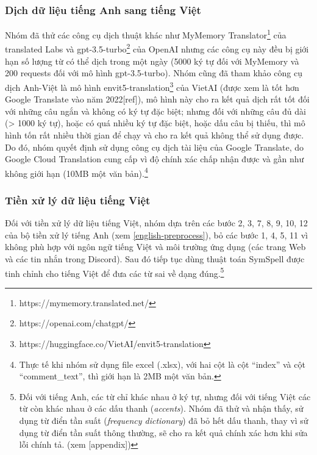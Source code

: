 \subsubsection{Dịch dữ liệu tiếng Anh sang tiếng Việt}
Nhóm đã thử các công cụ dịch thuật khác như MyMemory Translator\footnote{https://mymemory.translated.net/} của translated Labs và gpt-3.5-turbo\footnote{https://openai.com/chatgpt/} của OpenAI nhưng các công cụ này đều bị giới hạn số lượng từ có thể dịch trong một ngày (5000 ký tự đối với MyMemory và 200 requests đối với mô hình gpt-3.5-turbo). Nhóm cũng đã tham khảo công cụ dịch Anh-Việt là mô hình envit5-translation\footnote{https://huggingface.co/VietAI/envit5-translation} của VietAI (được xem là tốt hơn Google Translate vào năm 2022[ref]), mô hình này cho ra kết quả dịch rất tốt đối với những câu ngắn và không có ký tự đặc biệt; nhưng đối với những câu đủ dài (> 1000 ký tự), hoặc có quá nhiều ký tự đặc biệt, hoặc dấu câu bị thiếu, thì mô hình tốn rất nhiều thời gian để chạy và cho ra kết quả không thể sử dụng được. Do đó, nhóm quyết định sử dụng công cụ dịch tài liệu của Google Translate, do Google Cloud Translation cung cấp vì độ chính xác chấp nhận được và gần như không giới hạn (10MB một văn bản).\footnote{Thực tế khi nhóm sử dụng file excel (.xlsx), với hai cột là cột ``index'' và cột ``comment\_text'', thì giới hạn là 2MB một văn bản.}

\subsubsection{Tiền xử lý dữ liệu tiếng Việt}
Đối với tiền xử lý dữ liệu tiếng Việt, nhóm dựa trên các bước 2, 3, 7, 8, 9, 10, 12 của bộ tiền xử lý tiếng Anh (xem \ref{english-preprocess}), bỏ các bước 1, 4, 5, 11 vì không phù hợp với ngôn ngữ tiếng Việt và môi trường ứng dụng (các trang Web và các tin nhắn trong Discord). Sau đó tiếp tục dùng thuật toán SymSpell được tinh chỉnh cho tiếng Việt để đưa các từ sai về dạng đúng.\footnote{Đối với tiếng Anh, các từ chỉ khác nhau ở ký tự, nhưng đối với tiếng Việt các từ còn khác nhau ở các dấu thanh (\textit{accents}). Nhóm đã thử và nhận thấy, sử dụng từ điển tần suất (\textit{frequency dictionary}) đã bỏ hết dấu thanh, thay vì sử dụng từ điển tần suất thông thường, sẽ cho ra kết quả chính xác hơn khi sửa lỗi chính tả. (xem [appendix])}
